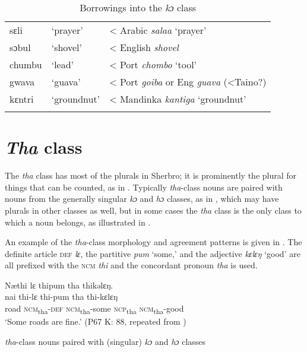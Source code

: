 \begin{table}
\caption{\label{tab:nounclass:42}Borrowings into the \textit{kɔ} class}

\begin{tabular}{lll}
\lsptoprule
sɛli & ‘prayer' & < Arabic \textit{salaa} ‘prayer'\\
sɔbul & ‘shovel' & < English \textit{shovel}\\
chumbu & ‘lead' & < Port \textit{chombo} ‘tool'\\
gwava & ‘guava' & < Port \textit{goiba} or Eng \textit{guava} (<Taino?)\\
kɛntri & ‘groundnut' & < Mandinka \textit{kantiga} ‘groundnut'\\
\lspbottomrule
\end{tabular}
\end{table}

\section{\textit{Tha} class}
\label{sec:5.9}\hypertarget{Toc115517796}{}
The \textit{tha} class has most of the plurals in Sherbro; it is prominently the plural for things that can be counted, as in . Typically \textit{tha}{}-class nouns are paired with nouns from the generally singular \textit{kɔ} and \textit{hɔ} classes, as in , which may have plurals in other classes as well, but in some cases the \textit{tha} class is the only class to which a noun belongs, as illustrated in .

An example of the \textit{tha}{}-class morphology and agreement patterns is given in . The definite article \textsc{def} \textit{lɛ}, the partitive \textit{pum} ‘some,' and the adjective \textit{kɛlɛŋ} ‘good' are all prefixed with the \textsc{ncm} \textit{thi} and the concordant pronoun \textit{tha} is used.

\ea%
    \label{ex:152}
    Næthi lɛ thipum tha thikəlɛŋ.\\
    \gll nai    thi-lɛ        thi-pum      tha     thi-kɛlɛŋ\\
    road    \textsc{ncm}\textsubscript{tha}{}-\textsc{def}    \textsc{ncm}\textsubscript{tha}{}-some  \textsc{ncp}\textsubscript{tha}    \textsc{ncm}\textsubscript{tha}{}-good\\
    \glt ‘Some roads are fine.' (P67 K: 88, repeated from )
\z

\ea%
    \label{ex:153}
    \textit{tha}{}-class nouns paired with (singular) \textit{kɔ} and \textit{hɔ} classes

